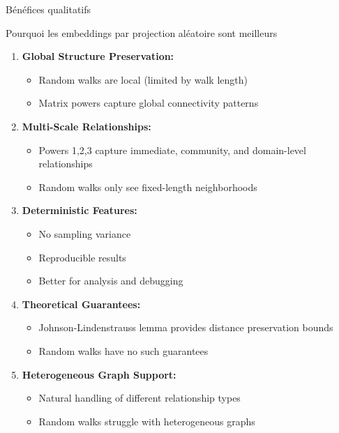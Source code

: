 \documentclass[9pt,aspectratio=169,professionalfonts]{beamer}
\begin{document}
\begin{frame}{Bénéfices qualitatifs}
\begin{block}{Pourquoi les embeddings par projection aléatoire sont meilleurs}
\begin{enumerate}
    \item \textbf{Global Structure Preservation:}
    \begin{itemize}
        \item Random walks are local (limited by walk length)
        \item Matrix powers capture global connectivity patterns
    \end{itemize}
    
    \item \textbf{Multi-Scale Relationships:}
    \begin{itemize}
        \item Powers 1,2,3 capture immediate, community, and domain-level relationships
        \item Random walks only see fixed-length neighborhoods
    \end{itemize}
    
    \item \textbf{Deterministic Features:}
    \begin{itemize}
        \item No sampling variance
        \item Reproducible results
        \item Better for analysis and debugging
    \end{itemize}
    
    \item \textbf{Theoretical Guarantees:}
    \begin{itemize}
        \item Johnson-Lindenstrauss lemma provides distance preservation bounds
        \item Random walks have no such guarantees
    \end{itemize}
    
    \item \textbf{Heterogeneous Graph Support:}
    \begin{itemize}
        \item Natural handling of different relationship types
        \item Random walks struggle with heterogeneous graphs
    \end{itemize}
\end{enumerate}
\end{block}
\end{frame}
\end{document}
